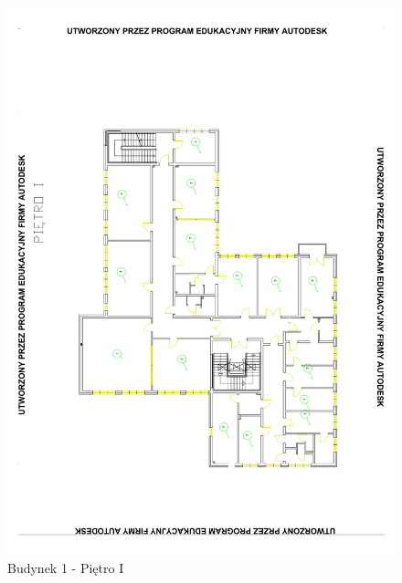 \begin{figure}[H]
  \begin{center}
    \includegraphics[width=\textwidth]{img/b1-1.pdf}
    \caption{Budynek 1 - Piętro I}
  \end{center}
\end{figure}

